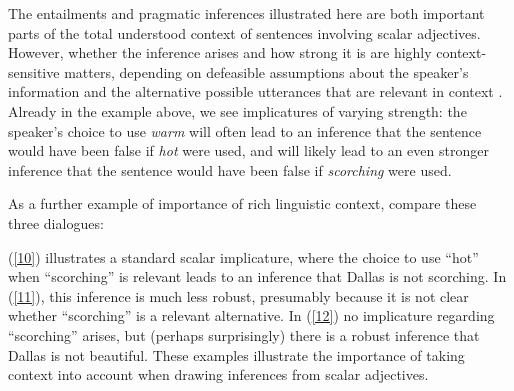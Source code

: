 \documentclass[10pt]{article}
\begin{document}
 \vspace{-.05in}
The entailments and pragmatic inferences illustrated here are both important parts of the total understood context of sentences involving scalar adjectives. However, whether the inference arises and how strong it is are highly context-sensitive matters, depending on defeasible assumptions about the speaker's information and the alternative possible utterances that are relevant in context \cite{hirschberg1991theory,frank2012predicting,goodman2013knowledge}. Already in the example above, we see implicatures of varying strength: the speaker's choice to use \emph{warm} will often lead to an inference that the sentence would have been false if \emph{hot} were used, and will likely lead to an even stronger inference that the sentence would have been false if \emph{scorching} were used. 

As a further example of importance of rich linguistic context, compare these three dialogues: 
 \vspace{-.1in}
\begin{multicols}{3}
\end{multicols}
 \vspace{-.1in}
\noindent
(\ref{10}) illustrates a standard scalar implicature, where the choice to use ``hot'' when ``scorching'' is relevant leads to an inference that Dallas is not scorching. In (\ref{11}), this inference is much less robust, presumably because it is not clear whether ``scorching'' is a relevant alternative. In (\ref{12}) no implicature regarding ``scorching'' arises, but (perhaps surprisingly) there is a robust inference that Dallas is not beautiful. These examples illustrate the importance of taking context into account when drawing inferences from scalar adjectives.
\end{document}

